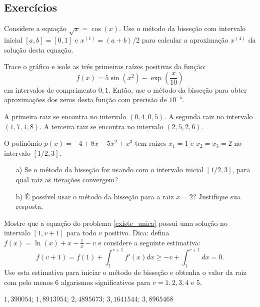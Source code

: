 
\fi
\subsection*{Exercícios}

\begin{exer}Considere a equação $\sqrt{x}=\cos(x)$. Use o método da bisseção com intervalo inicial $[a, b] = [0, 1]$ e $x^{(1)} = (a+b)/2$ para calcular a aproximação $x^{(4)}$ da solução desta equação.
\end{exer}

\begin{exer} Trace o gráfico e isole as três primeiras raízes positivas da função:
  \begin{equation*}
    f(x)=5\sin(x^2)-\exp\left({\frac{x}{10}}\right)  
  \end{equation*}
em intervalos de comprimento $0,1$. Então, use o método da bisseção para obter aproximações dos zeros desta função com precisão de $10^{-5}$.
\end{exer}
\begin{resp}
  
    A primeira raiz se encontra no intervalo $(0,4, 0,5)$. A segunda raiz no intervalo $(1,7, 1,8)$. A terceira raiz se encontra no intervalo $(2,5, 2,6)$.    
  
\end{resp}

\begin{exer}\label{exer:raizes_multiplas}
  O polinômio $p(x) = -4 + 8x - 5x^2 + x^3$ tem raízes $x_1=1$ e $x_2=x_3=2$ no intervalo $[1/2, 3]$.
  \begin{itemize}
  \item[a)] Se o método da bisseção for usando com o intervalo inicial $[1/2, 3]$, para qual raiz as iterações convergem?
  \item[b)] É possível usar o método da bisseção para a raiz $x=2$? Justifique sua resposta.
  \end{itemize}
\end{exer}

\begin{exer} Mostre que a equação do problema \ref{existe_unica} possui uma solução no intervalo $[1, v+1]$ para todo $v$ positivo. Dica: defina $f(x)=\ln(x)+x-\frac{1}{x}-v$  e considere a seguinte estimativa:
  \begin{equation*}
    f(v+1)=f(1)+\int_1^{v+1}f'(x)dx\geq -v+\int_1^{v+1}dx=0.  
  \end{equation*}
Use esta estimativa para iniciar o método de bisseção e obtenha o valor da raiz com pelo menos 6 algarismos significativos para $v=1, 2, 3, 4$ e $5$.
\end{exer}
\begin{resp}
  
    $1,390054$; $1,8913954$; $2,4895673$; $3,1641544$; $3,8965468$    
  
\end{resp}

